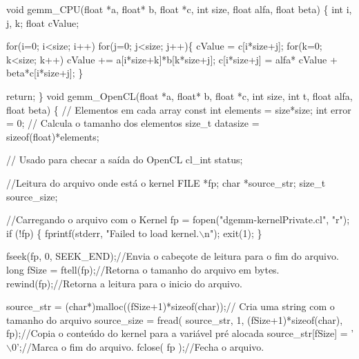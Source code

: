 \begin{DoxyCodeInclude}
{{{{\textcolor{keywordtype}{void} gemm\_CPU(\textcolor{keywordtype}{float} *a, \textcolor{keywordtype}{float}* b, \textcolor{keywordtype}{float} *c, \textcolor{keywordtype}{int} size, \textcolor{keywordtype}{float} alfa, \textcolor{keywordtype}{float} beta)
\{
    \textcolor{keywordtype}{int} i, j, k;
    \textcolor{keywordtype}{float} cValue;

    \textcolor{keywordflow}{for}(i=0; i<size; i++)
        \textcolor{keywordflow}{for}(j=0; j<size; j++)\{
            cValue = c[i*size+j];
            \textcolor{keywordflow}{for}(k=0; k<size; k++)
                cValue += a[i*size+k]*b[k*size+j];
            c[i*size+j] = alfa* cValue + beta*c[i*size+j];
        \}

        \textcolor{keywordflow}{return};
\}
\textcolor{keywordtype}{void} gemm\_OpenCL(\textcolor{keywordtype}{float} *a, \textcolor{keywordtype}{float}* b, \textcolor{keywordtype}{float} *c, \textcolor{keywordtype}{int} size, \textcolor{keywordtype}{int} t, \textcolor{keywordtype}{float} alfa, \textcolor{keywordtype}{float} beta)
\{
    \textcolor{comment}{// Elementos em cada array}
    \textcolor{keyword}{const} \textcolor{keywordtype}{int} elements = size*size;
    \textcolor{keywordtype}{int} error = 0;
    \textcolor{comment}{// Calcula o tamanho dos elementos}
    \textcolor{keywordtype}{size\_t} datasize = \textcolor{keyword}{sizeof}(float)*elements;

    \textcolor{comment}{// Usado para checar a saída do OpenCL}
    cl\_int status;


    \textcolor{comment}{//Leitura do arquivo onde está o kernel}
    FILE *fp;
    \textcolor{keywordtype}{char} *source\_str;
    \textcolor{keywordtype}{size\_t} source\_size;

    \textcolor{comment}{//Carregando o arquivo com o Kernel}
    fp = fopen(\textcolor{stringliteral}{"dgemm-kernelPrivate.cl"}, \textcolor{stringliteral}{"r"});
    \textcolor{keywordflow}{if} (!fp) \{
        fprintf(stderr, \textcolor{stringliteral}{"Failed to load kernel.\(\backslash\)n"});
        exit(1);
    \}

    fseek(fp, 0, SEEK\_END);\textcolor{comment}{//Envia o cabeçote de leitura para o fim do arquivo.}
    \textcolor{keywordtype}{long} fSize = ftell(fp);\textcolor{comment}{//Retorna o tamanho do arquivo em bytes.}
    rewind(fp);\textcolor{comment}{//Retorna a leitura para o inicio do arquivo.}

    source\_str = (\textcolor{keywordtype}{char}*)malloc((fSize+1)*\textcolor{keyword}{sizeof}(char));\textcolor{comment}{// Cria uma string com o tamanho do arquivo}
    source\_size = fread( source\_str, 1, (fSize+1)*\textcolor{keyword}{sizeof}(\textcolor{keywordtype}{char}), fp);\textcolor{comment}{//Copia o conteúdo do kernel para a
       variável pré alocada}
    source\_str[fSize] = \textcolor{charliteral}{'\(\backslash\)0'};\textcolor{comment}{//Marca o fim do arquivo.}
    fclose( fp );\textcolor{comment}{//Fecha o arquivo.}

}}}}
\end{DoxyCodeInclude}
